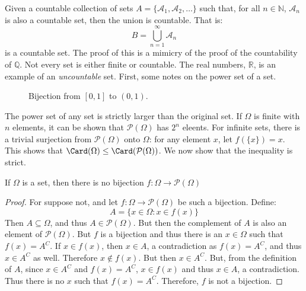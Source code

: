     Given a countable collection of sets
    $A=\{\mathcal{A}_{1},\mathcal{A}_{2},\hdots\}$ such
    that, for all $n\in\mathbb{N}$, $\mathcal{A}_{n}$ is
    also a countable set, then the union is countable. That is:
    \begin{equation}
        B=\bigcup_{n=1}^{\infty}\mathcal{A}_{n}
    \end{equation}
    is a countable set. The proof of this is a mimicry of
    the proof of the countability of $\mathbb{Q}$. Not
    every set is either finite or countable. The real numbers,
    $\mathbb{R}$, is an example of an \textit{uncountable}
    set. First, some notes on the power set of a set.
    \begin{figure}[H]
        \centering
        \captionsetup{type=figure}
        
        \caption{Bijection from $[0,1]$ to $(0,1)$.}
        \label{fig:Measure_Theory_Bijection_Closed_I_to_Open}
    \end{figure}
    The power set of any set is strictly larger than the
    original set. If $\Omega$ is finite with $n$ elements, it
    can be shown that $\mathcal{P}(\Omega)$ has $2^{n}$
    eleents. For infinite sets, there is a trivial surjection
    from $\mathcal{P}(\Omega)$ onto $\Omega$: for any element
    $x$, let $f(\{x\})=x$. This shows that
    $\Card(\Omega)\leq\Card(\mathcal{P}(\Omega))$. We now show
    that the inequality is strict.
    \begin{theorem}
        If $\Omega$ is a set, then there is no bijection
        $f:\Omega\rightarrow\mathcal{P}(\Omega)$
    \end{theorem}
    \begin{proof}
        For suppose not, and let
        $f:\Omega\rightarrow\mathcal{P}(\Omega)$ be such a
        bijection. Define:
        \begin{equation}
            A=\{x\in\Omega:x\in{f}(x)\}
        \end{equation}
        Then $A\subseteq\Omega$, and thus
        $A\in\mathcal{P}(\Omega)$. But then the complement of
        $A$ is also an element of $\mathcal{P}(\Omega)$. But
        $f$ is a bijection and thus there is an $x\in\Omega$
        such that $f(x)=A^{C}$. If $x\in{f}(x)$, then
        $x\in{A}$, a contradiction as $f(x)=A^{C}$, and thus
        $x\in{A}^{C}$ as well. Therefore $x\notin{f}(x)$. But
        then $x\in{A}^{C}$. But, from the definition of $A$,
        since $x\in{A}^{C}$ and $f(x)=A^{C}$, $x\in{f}(x)$
        and thus $x\in{A}$, a contradiction. Thus there is no
        $x$ such that $f(x)=A^{C}$. Therefore, $f$ is not a
        bijection.
    \end{proof}
